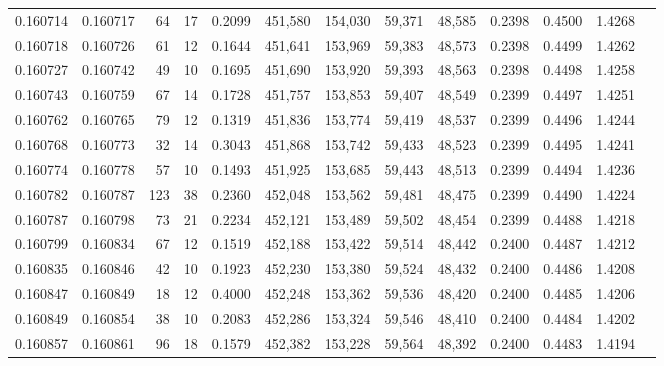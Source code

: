 \begin{tabular}{rrrrrrrrrrrrr}
0.160714 & 0.160717 &    64 &  17 &                                     0.2099 & 451,580 & 154,030 &  59,371 &  48,585 & 0.2398 & 0.4500 & 1.4268 \\
0.160718 & 0.160726 &    61 &  12 &                                     0.1644 & 451,641 & 153,969 &  59,383 &  48,573 & 0.2398 & 0.4499 & 1.4262 \\
0.160727 & 0.160742 &    49 &  10 &                                     0.1695 & 451,690 & 153,920 &  59,393 &  48,563 & 0.2398 & 0.4498 & 1.4258 \\
0.160743 & 0.160759 &    67 &  14 &                                     0.1728 & 451,757 & 153,853 &  59,407 &  48,549 & 0.2399 & 0.4497 & 1.4251 \\
0.160762 & 0.160765 &    79 &  12 &                                     0.1319 & 451,836 & 153,774 &  59,419 &  48,537 & 0.2399 & 0.4496 & 1.4244 \\
0.160768 & 0.160773 &    32 &  14 &                                     0.3043 & 451,868 & 153,742 &  59,433 &  48,523 & 0.2399 & 0.4495 & 1.4241 \\
0.160774 & 0.160778 &    57 &  10 &                                     0.1493 & 451,925 & 153,685 &  59,443 &  48,513 & 0.2399 & 0.4494 & 1.4236 \\
0.160782 & 0.160787 &   123 &  38 &                                     0.2360 & 452,048 & 153,562 &  59,481 &  48,475 & 0.2399 & 0.4490 & 1.4224 \\
0.160787 & 0.160798 &    73 &  21 &                                     0.2234 & 452,121 & 153,489 &  59,502 &  48,454 & 0.2399 & 0.4488 & 1.4218 \\
0.160799 & 0.160834 &    67 &  12 &                                     0.1519 & 452,188 & 153,422 &  59,514 &  48,442 & 0.2400 & 0.4487 & 1.4212 \\
0.160835 & 0.160846 &    42 &  10 &                                     0.1923 & 452,230 & 153,380 &  59,524 &  48,432 & 0.2400 & 0.4486 & 1.4208 \\
0.160847 & 0.160849 &    18 &  12 &                                     0.4000 & 452,248 & 153,362 &  59,536 &  48,420 & 0.2400 & 0.4485 & 1.4206 \\
0.160849 & 0.160854 &    38 &  10 &                                     0.2083 & 452,286 & 153,324 &  59,546 &  48,410 & 0.2400 & 0.4484 & 1.4202 \\
0.160857 & 0.160861 &    96 &  18 &                                     0.1579 & 452,382 & 153,228 &  59,564 &  48,392 & 0.2400 & 0.4483 & 1.4194 \\

\end{tabular}
